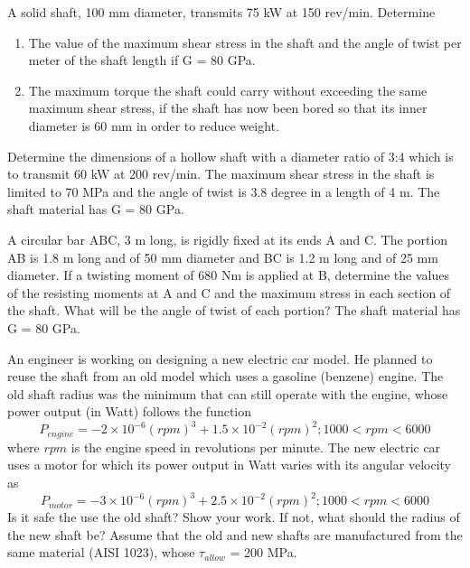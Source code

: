 \documentclass[
10pt,
a4paper,
openany,
svgnames,
]{book} %
\newcommand{\AxisRotator}[1][rotate=0]{%
    \tikz[x=0.25cm,y=0.60cm,line width=.2ex,-stealth,#1] \draw(0,0) arc (150:-150:1 and 1);%
}
\newcommand{\exercise}{%
\item\label{lab:\arabic{chapter}.\arabic{exercisesi}}  %
}
\begin{document}
\begin{exercises}

  \exercise A solid shaft, 100 mm diameter, transmits 75 kW at 150 rev/min. Determine

  \begin{figure}[H]
    \centering
  \end{figure}
  
  \begin{enumerate}
  \item The value of the maximum shear stress in the shaft and the angle of twist per meter of the shaft length if G = 80 GPa.
  \item The maximum torque the shaft could carry without exceeding the same maximum shear stress, if the shaft has now been bored so that its inner diameter is 60 mm in order to reduce weight.
  \end{enumerate}
  
  \exercise  Determine the dimensions of a hollow shaft with a diameter ratio of 3:4 which is to transmit 60 kW at 200 rev/min. The maximum shear stress in the shaft is limited to 70 MPa and the angle of twist is 3.8 degree in a length of 4 m. The shaft material has G = 80 GPa.

  \exercise A circular bar ABC, 3 m long, is rigidly fixed at its ends A and C. The portion AB is 1.8 m long and of 50 mm diameter and BC is 1.2 m long and of 25 mm diameter. If a twisting moment of 680 Nm is applied at B, determine the values of the resisting moments at A and C and the maximum stress in each section of the shaft. What will be the angle of twist of each portion? The shaft material has G = 80 GPa.

  \exercise An engineer is working on designing a new electric car model. He planned to reuse the shaft from an old model which uses a gasoline (benzene) engine. The old shaft radius was the minimum that can still operate with the engine, whose power output (in Watt) follows the function
	$$ P_{engine} = -2\times10^{-6} (rpm)^3 + 1.5 \times 10^{-2} (rpm)^2; 1000 < rpm < 6000 $$ 
where $rpm$ is the engine speed in revolutions per minute. The new electric car uses a motor for which its power output in Watt varies with its angular velocity as
	$$ P_{motor} = -3 \times 10^{-6}(rpm)^3 + 2.5 \times 10^{-2} (rpm)^2; 1000 < rpm < 6000 $$
        Is it safe the use the old shaft? Show your work. If not, what should the radius of the new shaft be? Assume that the old and new shafts are manufactured from the same material (AISI 1023), whose $\tau_{allow}$ = 200 MPa.
        
\end{exercises}
\end{document}
